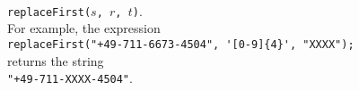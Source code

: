\begin{enumerate}
      \\[0.2cm]
      \hspace*{1.3cm}
      \texttt{replaceFirst($s$, $r$, $t$)}.
      \\[0.2cm]
      For example, the expression
      \\[0.2cm]
      \hspace*{1.3cm}
      \verb|replaceFirst("+49-711-6673-4504", '[0-9]{4}', "XXXX");| 
      \\[0.2cm]
      returns the string
      \\[0.2cm]
      \hspace*{1.3cm}
      \verb|"+49-711-XXXX-4504"|.
\end{enumerate}




